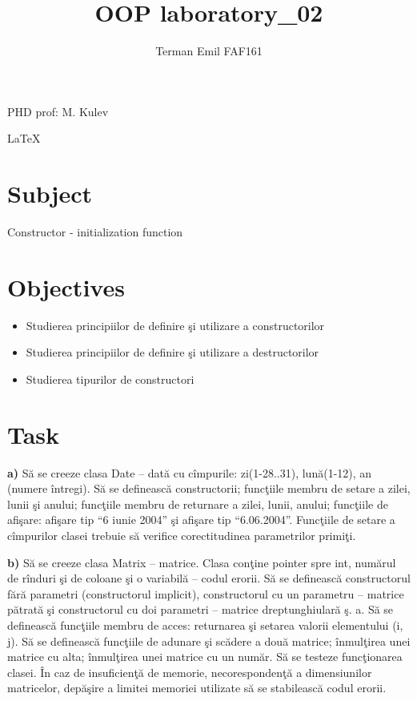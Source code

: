 \documentclass{article}
\begin{document}

	\title{OOP laboratory\_02}
	\author{Terman Emil FAF161}
	\maketitle

	\vspace*{\fill}
	
	\begin{flushright}
		PHD prof: M. Kulev
	\end{flushright}

	\begin{center}
		\LaTeX
	\end{center}

	\pagebreak

	\section{Subject}
		Constructor - initialization function
	\section{Objectives}
		\begin{itemize}
			\item Studierea principiilor de definire şi utilizare a constructorilor

			\item Studierea principiilor de def­­­inire şi utilizare a destructorilor
			
			\item Studierea tipurilor de constructori
		\end{itemize}

	\section{Task}
		\textbf{a)} Să se creeze clasa Date – dată cu cîmpurile: zi(1-28..31), lună(1-12), an (numere întregi). Să se definească constructorii; funcţiile membru de setare a zilei, lunii şi anului; funcţiile membru de returnare a zilei, lunii, anului; funcţiile de afişare: afişare tip \enquote{6 iunie 2004} şi afişare tip \enquote{6.06.2004}. Funcţiile de setare a cîmpurilor clasei trebuie să verifice corectitudinea parametrilor primiţi.

		\textbf{b)} Să se creeze clasa Matrix – matrice. Clasa conţine pointer spre int, numărul de rînduri şi de coloane şi o variabilă – codul erorii. Să se definească constructorul fără parametri (constructorul implicit), constructorul cu un parametru – matrice pătrată şi constructorul cu doi parametri – matrice dreptunghiulară ş. a. Să se definească funcţiile membru de acces: returnarea şi setarea valorii elementului (i, j). Să se definească funcţiile de adunare şi scădere a două matrice; înmulţirea unei matrice cu alta; înmulţirea unei matrice cu un număr. Să se testeze funcţionarea clasei. În caz de insuficienţă de memorie, necorespondenţă a dimensiunilor matricelor, depăşire a limitei memoriei utilizate să se stabilească codul erorii. 
\end{document}
